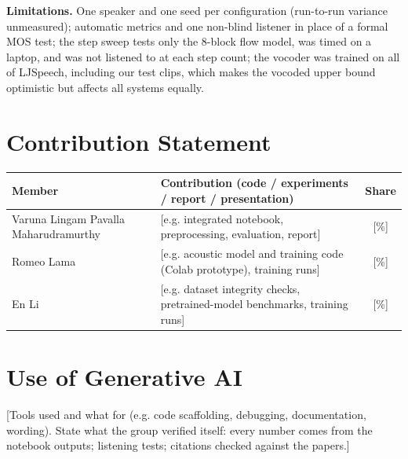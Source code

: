 \documentclass[11pt,a4paper]{article}
\newcommand{\ph}[1]{\colorbox{red!12}{\textcolor{red!70!black}{\small\textsf{[#1]}}}}
\begin{document}
\noindent\textbf{Limitations.} One speaker and one seed per configuration (run-to-run variance unmeasured); automatic metrics and one non-blind listener in place of a formal MOS test; the step sweep tests only the 8-block flow model, was timed on a laptop, and was not listened to at each step count; the vocoder was trained on all of LJSpeech, including our test clips, which makes the vocoded upper bound optimistic but affects all systems equally.




\appendix
\section{Contribution Statement}
\begin{tabularx}{\linewidth}{@{}l>{\raggedright\arraybackslash}Xc@{}}
\toprule
Member & Contribution (code / experiments / report / presentation) & Share \\ \midrule
Varuna Lingam Pavalla Maharudramurthy & \ph{e.g. integrated notebook, preprocessing, evaluation, report} & \ph{\%} \\
Romeo Lama & \ph{e.g. acoustic model and training code (Colab prototype), training runs} & \ph{\%} \\
En Li & \ph{e.g. dataset integrity checks, pretrained-model benchmarks, training runs} & \ph{\%} \\ \bottomrule
\end{tabularx}

\section{Use of Generative AI}
\ph{Tools used and what for (e.g. code scaffolding, debugging, documentation, wording). State what the group verified itself: every number comes from the notebook outputs; listening tests; citations checked against the papers.}
\end{document}
